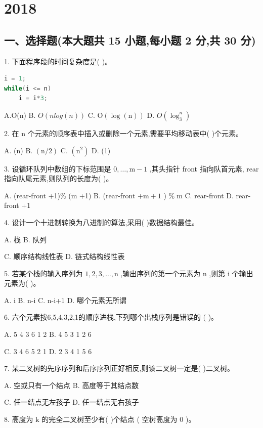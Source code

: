 \chapter{2018}
\section*{一、选择题(本大题共 15 小题,每小题 2 分,共 30 分)}

1. 下面程序段的时间复杂度是(   )。
\begin{lstlisting}[language=C, basicstyle=\ttfamily]
i = 1;
while(i <= n)
    i = i*3;
\end{lstlisting}

A.O(n) B. \(O\left( {{nlog}\left( n\right) }\right)\) C. \(\mathrm{O}\left( {\log \left( \mathrm{n}\right) }\right)\) D. \(O\left( {\log }_{3}^{n}\right)\)

2. 在 \(\mathrm{n}\) 个元素的顺序表中插入或删除一个元素,需要平均移动表中(   )个元素。

A. (n) B. \(\left( {\mathrm{n}/2}\right)\) C. \(\left( {\mathrm{n}}^{2}\right)\) D. (1)

3. 设循环队列中数组的下标范围是 \(0,\ldots ,\mathrm{m} - 1\) ,其头指针 front 指向队首元素, rear 指向队尾元素,则队列的长度为(   )。

A. (rear-front +1)\% (m +1) B. (rear-front \(+ \mathrm{m} + 1\) ) \(\% \mathrm{\;m}\)
C. rear-front D. rear-front +1

4. 设计一个十进制转换为八进制的算法,采用(   )数据结构最佳。

A. 栈 B. 队列

C. 顺序结构线性表 D. 链式结构线性表

5. 若某个栈的输入序列为 \(1,2,3,\ldots ,\mathrm{n}\) ,输出序列的第一个元素为 \(\mathrm{n}\) ,则第 \(\mathrm{i}\) 个输出元素为(   )。

A. i B. n-i C. n-i+1 D. 哪个元素无所谓

6. 六个元素按6,5,4,3,2,1的顺序进栈,下列哪个出栈序列是错误的 (   )。

A. 5 4 3 6 1 2 B. 4 5 3 1 2 6

C. 3 4 6 5 2 1 D. 2 3 4 1 5 6

7. 某二叉树的先序序列和后序序列正好相反,则该二叉树一定是(   )二叉树。

A. 空或只有一个结点 B. 高度等于其结点数

C. 任一结点无左孩子 D. 任一结点无右孩子

8. 高度为 \(\mathrm{k}\) 的完全二叉树至少有(   )个结点 ( 空树高度为 0 )。

